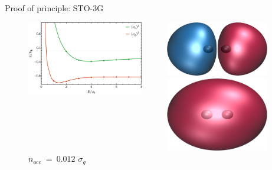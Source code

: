 \documentclass[10pt]{beamer}
\begin{document}
\begin{frame}{Proof of principle:  STO-3G}
\begin{figure}
\begin{columns}
      \begin{column}{0.68\textwidth}
        \includegraphics[width=0.9\textwidth]{Figures/fig_1a.pdf}
      \end{column}

      \begin{column}{0.15\textwidth}
        \includegraphics[width=0.9\textwidth]{Figures/H2_SA_mo1.cube.png}
        \caption*{\centering $n_\text{occ}~=~1.988$
        $\sigma_u$}
        \includegraphics[width=0.9\textwidth]{Figures/H2_SA_mo2.cube.png}
        \caption*{\centering $n_\text{occ}~=~0.012$
        $\sigma_g$}
      \end{column}
      

\end{columns}
\end{figure}
\end{frame}
\end{document}
